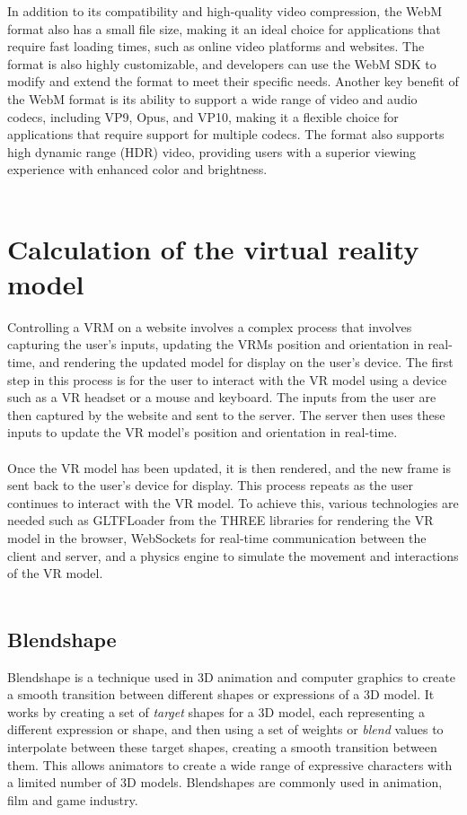 In addition to its compatibility and high-quality video compression, the WebM format also has 
a small file size, making it an ideal choice for applications that require fast loading times, 
such as online video platforms and websites. The format is also highly customizable, and developers 
can use the WebM SDK to modify and extend the format to meet their specific needs.
Another key benefit of the WebM format is its ability to support a wide range of video and audio 
codecs, including VP9, Opus, and VP10, making it a flexible choice for applications that require 
support for multiple codecs. The format also supports high dynamic range (HDR) video, providing 
users with a superior viewing experience with enhanced color and brightness. \cite{webm}
\\
\\
\section{Calculation of the virtual reality model} 
Controlling a VRM on a website involves a complex process that involves 
capturing the user's inputs, updating the VRMs position and orientation in real-time, 
and rendering the updated model for display on the user's device.
The first step in this process is for the user to interact with the VR model 
using a device such as a VR headset or a mouse and keyboard. The inputs from the 
user are then captured by the website and sent to the server. The server then 
uses these inputs to update the VR model's position and orientation in real-time. 
\\
\\
Once the VR model has been updated, it is then rendered, and the new frame is 
sent back to the user's device for display. This process repeats as the user 
continues to interact with the VR model. 
To achieve this, various technologies are needed such as GLTFLoader\cite{GLTFLoader} from the THREE\cite{threejs}
libraries for rendering the VR model in the browser, WebSockets for real-time 
communication between the client and server, and a physics engine to simulate 
the movement and interactions of the VR model. 
\\
\\
\subsection{Blendshape}
Blendshape is a technique used in 3D animation and computer graphics to create a smooth transition between different shapes or expressions of a 3D model. 
It works by creating a set of \emph{target} shapes for a 3D model, each representing a different expression or shape, 
and then using a set of weights or \emph{blend} values to interpolate between these target shapes, creating a 
smooth transition between them. This allows animators to create a wide range of expressive characters with a 
limited number of 3D models. Blendshapes are commonly used in animation, film and game industry.
\\
\\
